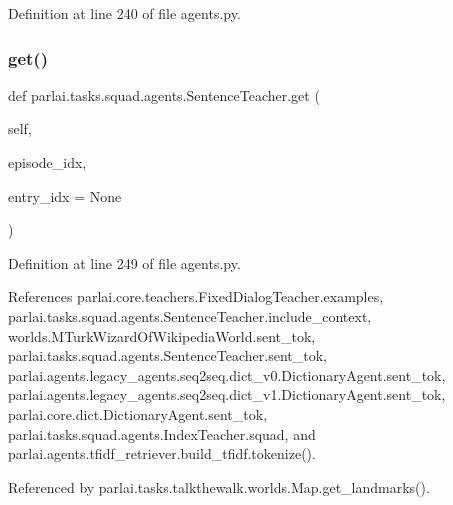 Definition at line 240 of file agents.\+py.

\mbox{\label{classparlai_1_1tasks_1_1squad_1_1agents_1_1SentenceTeacher_a940eaa197e21e8237fc459e55d68d61f}} 
\subsubsection{\texorpdfstring{get()}{get()}}
{\footnotesize\ttfamily def parlai.\+tasks.\+squad.\+agents.\+Sentence\+Teacher.\+get (\begin{DoxyParamCaption}\item[{}]{self,  }\item[{}]{episode\+\_\+idx,  }\item[{}]{entry\+\_\+idx = {\ttfamily None} }\end{DoxyParamCaption})}



Definition at line 249 of file agents.\+py.



References parlai.\+core.\+teachers.\+Fixed\+Dialog\+Teacher.\+examples, parlai.\+tasks.\+squad.\+agents.\+Sentence\+Teacher.\+include\+\_\+context, worlds.\+M\+Turk\+Wizard\+Of\+Wikipedia\+World.\+sent\+\_\+tok, parlai.\+tasks.\+squad.\+agents.\+Sentence\+Teacher.\+sent\+\_\+tok, parlai.\+agents.\+legacy\+\_\+agents.\+seq2seq.\+dict\+\_\+v0.\+Dictionary\+Agent.\+sent\+\_\+tok, parlai.\+agents.\+legacy\+\_\+agents.\+seq2seq.\+dict\+\_\+v1.\+Dictionary\+Agent.\+sent\+\_\+tok, parlai.\+core.\+dict.\+Dictionary\+Agent.\+sent\+\_\+tok, parlai.\+tasks.\+squad.\+agents.\+Index\+Teacher.\+squad, and parlai.\+agents.\+tfidf\+\_\+retriever.\+build\+\_\+tfidf.\+tokenize().



Referenced by parlai.\+tasks.\+talkthewalk.\+worlds.\+Map.\+get\+\_\+landmarks().

